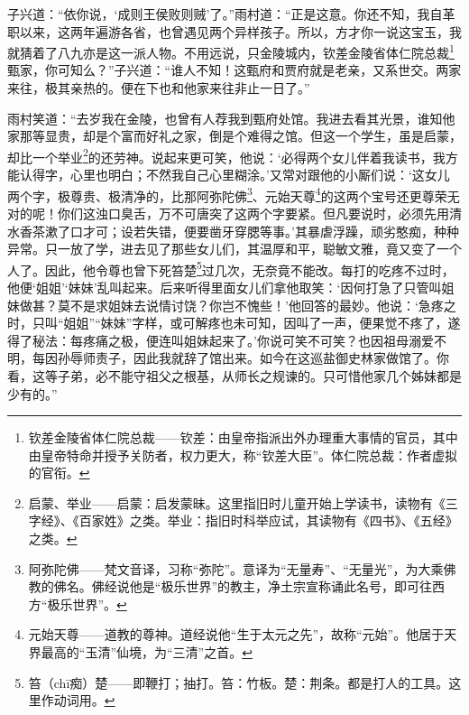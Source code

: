 \par 子兴道：“依你说，‘成则王侯败则贼’了。”雨村道：“正是这意。你还不知，我自革职以来，这两年遍游各省，也曾遇见两个异样孩子。所以，方才你一说这宝玉，我就猜着了八九亦是这一派人物。不用远说，只金陵城内，钦差金陵省体仁院总裁\footnote{钦差金陵省体仁院总裁——钦差：由皇帝指派出外办理重大事情的官员，其中由皇帝特命并授予关防者，权力更大，称“钦差大臣”。体仁院总裁：作者虚拟的官衔。}甄家，你可知么？”子兴道：“谁人不知！这甄府和贾府就是老亲，又系世交。两家来往，极其亲热的。便在下也和他家来往非止一日了。”
\par 雨村笑道：“去岁我在金陵，也曾有人荐我到甄府处馆。我进去看其光景，谁知他家那等显贵，却是个富而好礼之家，倒是个难得之馆。但这一个学生，虽是启蒙，却比一个举业\footnote{启蒙、举业——启蒙：启发蒙昧。这里指旧时儿童开始上学读书，读物有《三字经》、《百家姓》之类。举业：指旧时科举应试，其读物有《四书》、《五经》之类。}的还劳神。说起来更可笑，他说：‘必得两个女儿伴着我读书，我方能认得字，心里也明白；不然我自己心里糊涂。’又常对跟他的小厮们说：‘这女儿两个字，极尊贵、极清净的，比那阿弥陀佛\footnote{阿弥陀佛——梵文音译，习称“弥陀”。意译为“无量寿”、“无量光”，为大乘佛教的佛名。佛经说他是“极乐世界”的教主，净土宗宣称诵此名号，即可往西方“极乐世界”。}、元始天尊\footnote{元始天尊——道教的尊神。道经说他“生于太元之先”，故称“元始”。他居于天界最高的“玉清”仙境，为“三清”之首。}的这两个宝号还更尊荣无对的呢！你们这浊口臭舌，万不可唐突了这两个字要紧。但凡要说时，必须先用清水香茶漱了口才可；设若失错，便要凿牙穿腮等事。’其暴虐浮躁，顽劣憨痴，种种异常。只一放了学，进去见了那些女儿们，其温厚和平，聪敏文雅，竟又变了一个人了。因此，他令尊也曾下死笞楚\footnote{笞（chī痴）楚——即鞭打；抽打。笞：竹板。楚：荆条。都是打人的工具。这里作动词用。}过几次，无奈竟不能改。每打的吃疼不过时，他便‘姐姐’‘妹妹’乱叫起来。后来听得里面女儿们拿他取笑：‘因何打急了只管叫姐妹做甚？莫不是求姐妹去说情讨饶？你岂不愧些！’他回答的最妙。他说：‘急疼之时，只叫“姐姐”“妹妹”字样，或可解疼也未可知，因叫了一声，便果觉不疼了，遂得了秘法：每疼痛之极，便连叫姐妹起来了。’你说可笑不可笑？也因祖母溺爱不明，每因孙辱师责子，因此我就辞了馆出来。如今在这巡盐御史林家做馆了。你看，这等子弟，必不能守祖父之根基，从师长之规谏的。只可惜他家几个姊妹都是少有的。”

